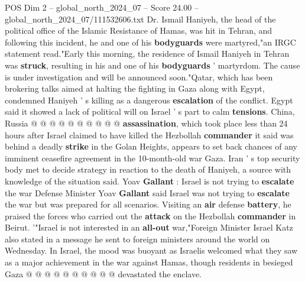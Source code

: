 \begin{textsample}{POS Dim 2 – global\_north\_2024\_07 – Score 24.00 – global\_north\_2024\_07/111532606.txt}
Dr.
Ismail Haniyeh, the head of the political office of the Islamic Resistance of Hamas, was hit in Tehran, and following this incident, he and one of his \textbf{bodyguards} were martyred,"an IRGC statement read."Early this morning, the residence of Ismail Haniyeh in Tehran was \textbf{struck}, resulting in his and one of his \textbf{bodyguards} ' martyrdom.
The cause is under investigation and will be announced soon."Qatar, which has been brokering talks aimed at halting the fighting in Gaza along with Egypt, condemned Haniyeh ' s killing as a dangerous \textbf{escalation} of the conflict.
Egypt said it showed a lack of political will on Israel ' s part to calm \textbf{tensions}.
China, Russia @ @ @ @ @ @ @ @ @ @ \textbf{assassination}, which took place less than 24 hours after Israel claimed to have killed the Hezbollah \textbf{commander} it said was behind a deadly \textbf{strike} in the Golan Heights, appears to set back chances of any imminent ceasefire agreement in the 10-month-old war Gaza.
Iran ' s top security body met to decide strategy in reaction to the death of Haniyeh, a source with knowledge of the situation said.
Yoav \textbf{Gallant} : Israel is not trying to \textbf{escalate} the war Defense Minister Yoav \textbf{Gallant} said Israel was not trying to \textbf{escalate} the war but was prepared for all scenarios.
Visiting an \textbf{air} defense \textbf{battery}, he praised the forces who carried out the \textbf{attack} on the Hezbollah \textbf{commander} in Beirut. '"Israel is not interested in an \textbf{all-out} war,"Foreign Minister Israel Katz also stated in a message he sent to foreign ministers around the world on Wednesday.
In Israel, the mood was buoyant as Israelis welcomed what they saw as a major achievement in the war against Hamas, though residents in besieged Gaza @ @ @ @ @ @ @ @ @ @ devastated the enclave.

\end{textsample}

